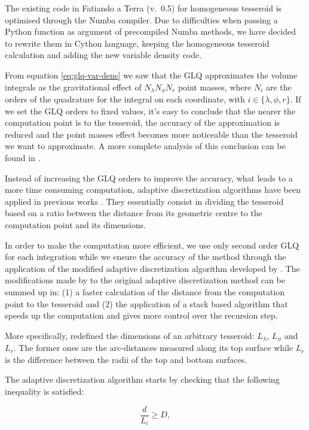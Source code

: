 \documentclass[extra]{gji}
\begin{document}
The existing code in Fatiando a Terra (v.~0.5) for homogeneous tesseroid is optimised through the Numba compiler.
Due to difficulties when passing a Python function as argument of precompiled Numba methods, we have decided to rewrite them in Cython language, keeping the homogeneous tesseroid calculation and adding the new variable density code.

From equation \ref{eq:glq-var-dens} we saw that the GLQ approximates the volume integrals as the gravitational effect of $N_\lambda N_\phi N_r$ point masses, where $N_i$ are the orders of the quadrature for the integral on each coordinate, with $i \in \{ \lambda, \phi, r \}$.
If we set the GLQ orders to fixed values, it's easy to conclude that the nearer the computation point is to the tesseroid, the accuracy of the approximation is reduced and the point masses effect becomes more noticeable than the tesseroid we want to approximate.
A more complete analysis of this conclusion can be found in \citet{Ku1977, Li2011, Uieda2016}.

Instead of increasing the GLQ orders to improve the accuracy, what leads to a more time consuming computation, adaptive discretization algorithms have been applied in previous works \citep{Li2011, Uieda2016}.
They essentially consist in dividing the tesseroid based on a ratio between the distance from its geometric centre to the computation point and its dimensions.

In order to make the computation more efficient, we use only second order GLQ for each integration while we ensure the accuracy of the method through the application of the modified adaptive discretization algorithm developed by \citet{Uieda2016}.
The modifications made by \citet{Uieda2016} to the original adaptive discretization method \citep{Li2011} can be summed up in:
(1) a faster calculation of the distance from the computation point to the tesseroid and 
(2) the application of a stack based algorithm that speeds up the computation and gives more control over the recursion step.

More specifically, \citet{Uieda2016} redefined the dimensions of an arbitrary tesseroid: $L_\lambda$, $L_\phi$ and $L_r$. The former ones are the arc-distances measured along its top surface while $L_r$ is the difference between the radii of the top and bottom surfaces.

The adaptive discretization algorithm starts by checking that the following inequality is satisfied:

\begin{equation}
    \frac{d}{L_i} \geq D,
\label{eq:distance-size-ratio}
\end{equation}
\end{document}

